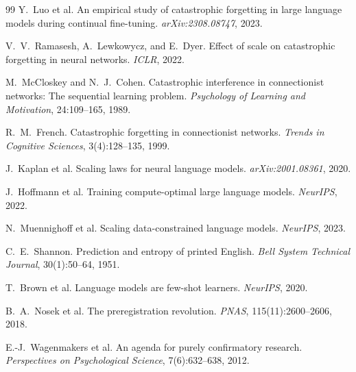 \documentclass[11pt,a4paper]{article}
\begin{document}
\begin{thebibliography}{99}
Y.~Luo et al.
\newblock An empirical study of catastrophic forgetting in large language models during continual fine-tuning.
\newblock \emph{arXiv:2308.08747}, 2023.

V.~V.~Ramasesh, A.~Lewkowycz, and E.~Dyer.
\newblock Effect of scale on catastrophic forgetting in neural networks.
\newblock \emph{ICLR}, 2022.

M.~McCloskey and N.~J.~Cohen.
\newblock Catastrophic interference in connectionist networks: The sequential learning problem.
\newblock \emph{Psychology of Learning and Motivation}, 24:109--165, 1989.

R.~M.~French.
\newblock Catastrophic forgetting in connectionist networks.
\newblock \emph{Trends in Cognitive Sciences}, 3(4):128--135, 1999.

J.~Kaplan et al.
\newblock Scaling laws for neural language models.
\newblock \emph{arXiv:2001.08361}, 2020.

J.~Hoffmann et al.
\newblock Training compute-optimal large language models.
\newblock \emph{NeurIPS}, 2022.

N.~Muennighoff et al.
\newblock Scaling data-constrained language models.
\newblock \emph{NeurIPS}, 2023.

C.~E.~Shannon.
\newblock Prediction and entropy of printed English.
\newblock \emph{Bell System Technical Journal}, 30(1):50--64, 1951.

T.~Brown et al.
\newblock Language models are few-shot learners.
\newblock \emph{NeurIPS}, 2020.

B.~A.~Nosek et al.
\newblock The preregistration revolution.
\newblock \emph{PNAS}, 115(11):2600--2606, 2018.

E.-J.~Wagenmakers et al.
\newblock An agenda for purely confirmatory research.
\newblock \emph{Perspectives on Psychological Science}, 7(6):632--638, 2012.

\end{thebibliography}
\end{document}
